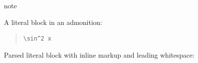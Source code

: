 \documentclass[a4paper]{article}
\begin{document}
\begin{DUclass}{note}
\begin{DUadmonition}

A literal block in an admonition:

\begin{quote}
\begin{verbatim}
\sin^2 x
\end{verbatim}
\end{quote}
\end{DUadmonition}
\end{DUclass}


Parsed literal block with inline markup and leading whitespace:
\end{document}
